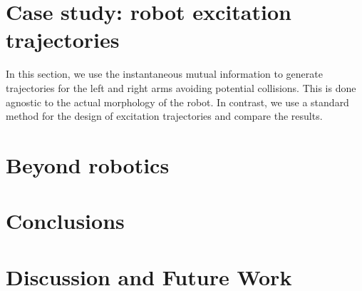 \section{Case study: robot excitation trajectories}
\TODO
In this section, we use the instantaneous mutual information to generate trajectories for the left and right arms avoiding potential collisions. This is done agnostic to the actual morphology of the robot. In contrast, we use a standard method for the design of excitation trajectories and compare the results.

\section{Beyond robotics}
\TODO
{}

\section{Conclusions}\label{sec:conclusion}


\section{Discussion and Future Work}


\printbibliography 
